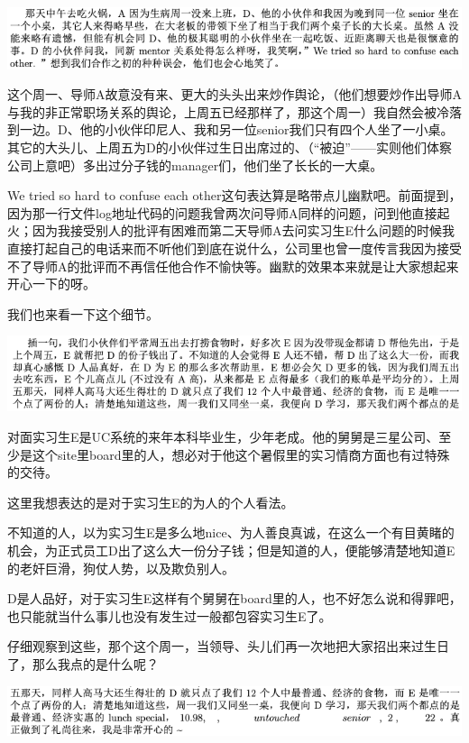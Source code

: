 \documentclass[9pt, b5paper]{article}
\begin{document}
\begin{center}
\includegraphics[width=.9\linewidth]{./pic/backups_plans_20210513_114330.png}
\end{center}

这个周一、导师A故意没有来、更大的头头出来炒作舆论，（他们想要炒作出导师A与我的非正常职场关系的舆论，上周五已经那样了，那这个周一）我自然会被冷落到一边。D、他的小伙伴印尼人、我和另一位senior我们只有四个人坐了一小桌。其它的大头儿、上周五为D的小伙伴过生日出席过的、（“被迫”——实则他们体察公司上意吧）多出过分子钱的manager们，他们坐了长长的一大桌。

We tried so hard to confuse each other这句表达算是略带点儿幽默吧。前面提到，因为那一行文件log地址代码的问题我曾两次问导师A同样的问题，问到他直接起火；因为我接受别人的批评有困难而第二天导师A去问实习生E什么问题的时候我直接打起自己的电话来而不听他们到底在说什么，公司里也曾一度传言我因为接受不了导师A的批评而不再信任他合作不愉快等。幽默的效果本来就是让大家想起来开心一下的呀。 

我们也来看一下这个细节。 

\begin{center}
\includegraphics[width=.9\linewidth]{./pic/backups_plans_20210513_115153.png}
\end{center}

对面实习生E是UC系统的来年本科毕业生，少年老成。他的舅舅是三星公司、至少是这个site里board里的人，想必对于他这个暑假里的实习情商方面也有过特殊的交待。

这里我想表达的是对于实习生E的为人的个人看法。 

不知道的人，以为实习生E是多么地nice、为人善良真诚，在这么一个有目黄睹的机会，为正式员工D出了这么大一份分子钱；但是知道的人，便能够清楚地知道E的老奸巨滑，狗仗人势，以及欺负别人。

D是人品好，对于实习生E这样有个舅舅在board里的人，也不好怎么说和得罪吧，也只能就当什么事儿也没有发生过一般都包容实习生E了。 

仔细观察到这些，那个这个周一，当领导、头儿们再一次地把大家招出来过生日了，那么我点的是什么呢？

\begin{center}
\includegraphics[width=.9\linewidth]{./pic/backups_plans_20210513_123640.png}
\end{center}
\end{document}
